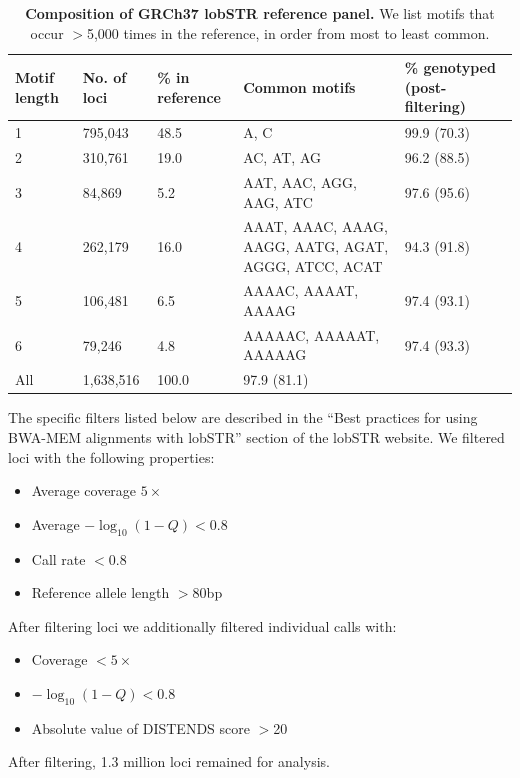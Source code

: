 \begin{table}[h!]
\centering
\label{tab:sgdptab1}
\begin{adjustbox}{width=1\textwidth}
\begin{tabular}{l l l l l}
\hline
Motif length & No. of loci & \% in reference & Common motifs & \% genotyped (post-filtering) \\
\hline
1	& 795,043	& 48.5	& A, C	& 99.9 (70.3) \\
2	& 310,761	& 19.0	& AC, AT, AG& 	96.2 (88.5) \\
3	& 84,869	& 5.2	& AAT, AAC, AGG, AAG, ATC &	97.6 (95.6) \\
4	& 262,179	& 16.0	& AAAT, AAAC, AAAG, AAGG, AATG, AGAT, AGGG, ATCC, ACAT	& 94.3 (91.8) \\
5	& 106,481	& 6.5	& AAAAC, AAAAT, AAAAG	& 97.4 (93.1)\\
6	& 79,246	& 4.8	& AAAAAC, AAAAAT, AAAAAG	& 97.4 (93.3) \\
All &	1,638,516	& 100.0	&	97.9 (81.1) \\
\hline
\end{tabular}
\end{adjustbox}
\caption{\textbf{Composition of GRCh37 lobSTR reference panel.} We list motifs that occur $>$5,000 times in the reference, in order from most to least common.}
\end{table}

The specific filters listed below are described in the ``Best practices for using BWA-MEM alignments with lobSTR'' section of the lobSTR website. We filtered loci with the following properties:

\begin{itemize}
\item Average coverage $5 \times$
\item Average $-\log_{10}(1-Q)<0.8$
\item Call rate $<0.8$
\item Reference allele length $>$80bp
\end{itemize}

After filtering loci we additionally filtered individual calls with:

\begin{itemize}
\item Coverage $<5 \times$
\item $-\log_{10}(1-Q)<0.8$
\item Absolute value of DISTENDS score $>$20
\end{itemize}
After filtering, 1.3 million loci remained for analysis.

